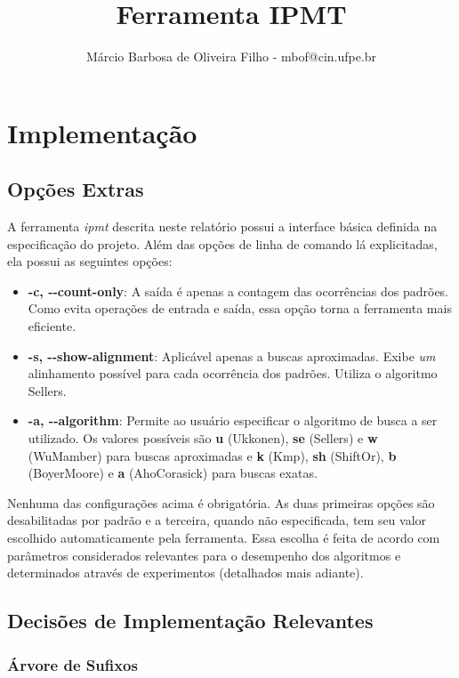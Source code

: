 \documentclass[]{article}
\title{Ferramenta IPMT}
\author{Márcio Barbosa de Oliveira Filho - mbof@cin.ufpe.br}
\date{}
\begin{document}
\maketitle

\section{Implementação}

\subsection{Opções Extras}
A ferramenta \textit{ipmt} descrita neste relatório possui a interface básica definida na especificação do projeto. Além das opções de linha de comando lá explicitadas, ela possui as seguintes opções:
\begin{itemize}
	\item \textbf{-c, -{}-count-only}: A saída é apenas a contagem das ocorrências dos padrões. Como evita operações de entrada e saída, essa opção torna a ferramenta mais eficiente.
	\item \textbf{-s, -{}-show-alignment}: Aplicável apenas a buscas aproximadas. Exibe \textit{um} alinhamento possível para cada ocorrência dos padrões. Utiliza o algoritmo Sellers.
	\item \textbf{-a, -{}-algorithm}: Permite ao usuário especificar o algoritmo de busca a ser utilizado. Os valores possíveis são \textbf{u} (Ukkonen), \textbf{se} (Sellers) e \textbf{w} (WuMamber) para buscas aproximadas e \textbf{k} (Kmp), \textbf{sh} (ShiftOr), \textbf{b} (BoyerMoore) e \textbf{a} (AhoCorasick) para buscas exatas.
\end{itemize}

Nenhuma das configurações acima é obrigatória. As duas primeiras opções são desabilitadas por padrão e a terceira, quando não especificada, tem seu valor escolhido automaticamente pela ferramenta. Essa escolha é feita de acordo com parâmetros considerados relevantes para o desempenho dos algoritmos e determinados através de experimentos (detalhados mais adiante). 


\subsection{Decisões de Implementação Relevantes}

\subsubsection{Árvore de Sufixos}
\end{document}
